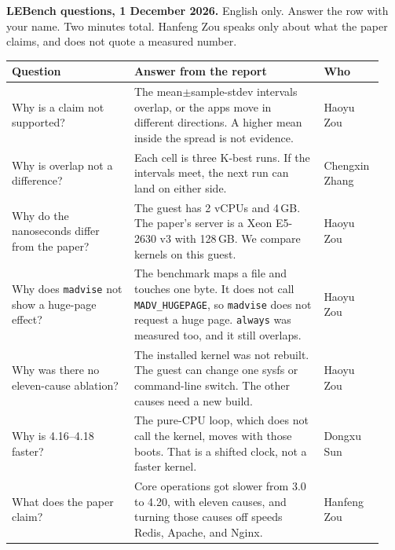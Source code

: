 \documentclass[10pt]{article}
\begin{document}
\textbf{LEBench questions, 1 December 2026.}
English only. Answer the row with your name. Two minutes total.
Hanfeng Zou speaks only about what the paper claims, and does not quote a measured number.

\begin{center}
\small
\setlength{\tabcolsep}{4pt}
\begin{tabular}{@{}p{0.31\linewidth}p{0.48\linewidth}p{0.15\linewidth}@{}}
\toprule
Question & Answer from the report & Who \\
\midrule
Why is a claim not supported? &
The mean$\pm$sample-stdev intervals overlap, or the apps move in different directions. A higher mean inside the spread is not evidence. &
Haoyu Zou \\
Why is overlap not a difference? &
Each cell is three K-best runs. If the intervals meet, the next run can land on either side. &
Chengxin Zhang \\
Why do the nanoseconds differ from the paper? &
The guest has 2 vCPUs and 4\,GB. The paper's server is a Xeon E5-2630 v3 with 128\,GB. We compare kernels on this guest. &
Haoyu Zou \\
Why does \texttt{madvise} not show a huge-page effect? &
The benchmark maps a file and touches one byte. It does not call \texttt{MADV\_HUGEPAGE}, so \texttt{madvise} does not request a huge page. \texttt{always} was measured too, and it still overlaps. &
Haoyu Zou \\
Why was there no eleven-cause ablation? &
The installed kernel was not rebuilt. The guest can change one sysfs or command-line switch. The other causes need a new build. &
Haoyu Zou \\
Why is 4.16--4.18 faster? &
The pure-CPU loop, which does not call the kernel, moves with those boots. That is a shifted clock, not a faster kernel. &
Dongxu Sun \\
What does the paper claim? &
Core operations got slower from 3.0 to 4.20, with eleven causes, and turning those causes off speeds Redis, Apache, and Nginx. &
Hanfeng Zou \\
\bottomrule
\end{tabular}
\end{center}
\end{document}
